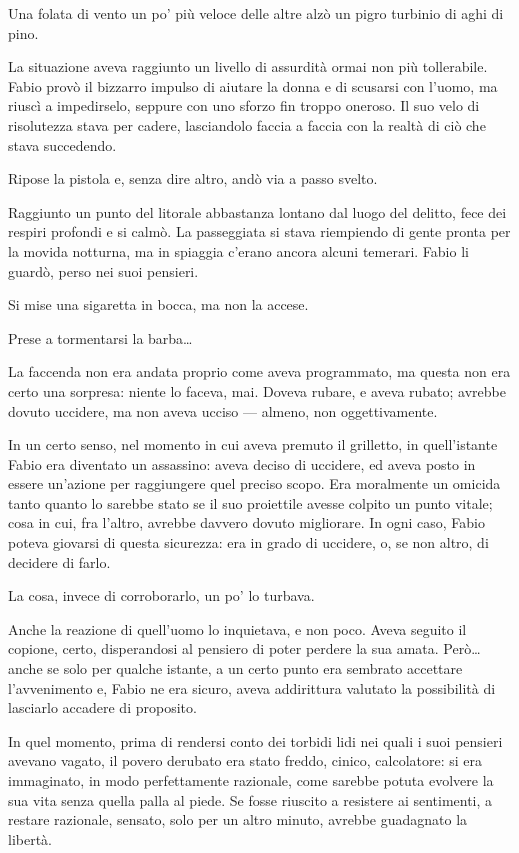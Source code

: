 Una folata di vento un po' più veloce delle altre alzò un pigro turbinio di aghi di pino.

La situazione aveva raggiunto un livello di assurdità ormai non più tollerabile. Fabio provò il bizzarro impulso di aiutare la donna e di scusarsi con l'uomo, ma riuscì a impedirselo, seppure con uno sforzo fin troppo oneroso. Il suo velo di risolutezza stava per cadere, lasciandolo faccia a faccia con la realtà di ciò che stava succedendo. 

Ripose la pistola e, senza dire altro, andò via a passo svelto.

Raggiunto un punto del litorale abbastanza lontano dal luogo del delitto, fece dei respiri profondi e si calmò. La passeggiata si stava riempiendo di gente pronta per la movida notturna, ma in spiaggia c'erano ancora alcuni temerari. Fabio li guardò, perso nei suoi pensieri. 

Si mise una sigaretta in bocca, ma non la accese. 

Prese a tormentarsi la barba\ldots

La faccenda non era andata proprio come aveva programmato, ma questa non era certo una sorpresa: niente lo faceva, mai. Doveva rubare, e aveva rubato; avrebbe dovuto uccidere, ma non aveva ucciso --- almeno, non oggettivamente. 

In un certo senso, nel momento in cui aveva premuto il grilletto, in quell'istante Fabio era diventato un assassino: aveva deciso di uccidere, ed aveva posto in essere un'azione per raggiungere quel preciso scopo. Era moralmente un omicida tanto quanto lo sarebbe stato se il suo proiettile avesse colpito un punto vitale; cosa in cui, fra l'altro, avrebbe davvero dovuto migliorare. In ogni caso, Fabio poteva giovarsi di questa sicurezza: era in grado di uccidere, o, se non altro, di decidere di farlo. 

La cosa, invece di corroborarlo, un po' lo turbava.

Anche la reazione di quell'uomo lo inquietava, e non poco. Aveva seguito il copione, certo, disperandosi al pensiero di poter perdere la sua amata. Però\ldots \thinspace anche se solo per qualche istante, a un certo punto era sembrato accettare l'avvenimento e, Fabio ne era sicuro, aveva addirittura valutato la possibilità di lasciarlo accadere di proposito. 

In quel momento, prima di rendersi conto dei torbidi lidi nei quali i suoi pensieri avevano vagato, il povero derubato era stato freddo, cinico, calcolatore: si era immaginato, in modo perfettamente razionale, come sarebbe potuta evolvere la sua vita senza quella palla al piede. Se fosse riuscito a resistere ai sentimenti, a restare razionale, sensato, solo per un altro minuto, avrebbe guadagnato la libertà. 

